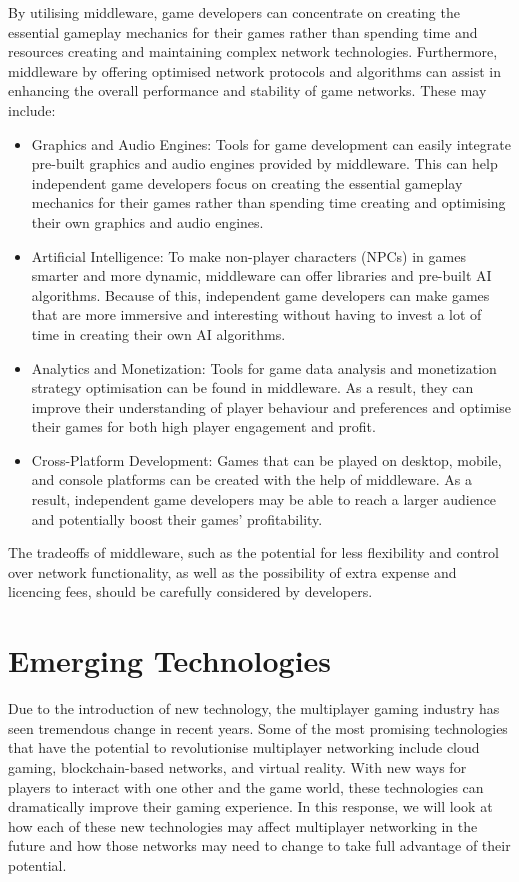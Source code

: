 By utilising middleware, game developers can concentrate on creating the essential gameplay mechanics for their games rather than spending time and resources creating and maintaining complex network technologies. Furthermore, middleware by offering optimised network protocols and algorithms can assist in enhancing the overall performance and stability of game networks. These may include:
\begin{itemize}
    \item Graphics and Audio Engines: Tools for game development can easily integrate pre-built graphics and audio engines provided by middleware. This can help independent game developers focus on creating the essential gameplay mechanics for their games rather than spending time creating and optimising their own graphics and audio engines.\cite{gamemiddleware}
    \item Artificial Intelligence: To make non-player characters (NPCs) in games smarter and more dynamic, middleware can offer libraries and pre-built AI algorithms. Because of this, independent game developers can make games that are more immersive and interesting without having to invest a lot of time in creating their own AI algorithms.\cite{gamenetworkmiddleware}
    \item Analytics and Monetization: Tools for game data analysis and monetization strategy optimisation can be found in middleware. As a result, they can improve their understanding of player behaviour and preferences and optimise their games for both high player engagement and profit.\cite{gamenetworkmiddleware}
    \item Cross-Platform Development: Games that can be played on desktop, mobile, and console platforms can be created with the help of middleware. As a result, independent game developers may be able to reach a larger audience and potentially boost their games' profitability.\cite{gamemiddleware}
\end{itemize}
The tradeoffs of middleware, such as the potential for less flexibility and control over network functionality, as well as the possibility of extra expense and licencing fees, should be carefully considered by developers.

\section{Emerging Technologies}
Due to the introduction of new technology, the multiplayer gaming industry has seen tremendous change in recent years. Some of the most promising technologies that have the potential to revolutionise multiplayer networking include cloud gaming, blockchain-based networks, and virtual reality. With new ways for players to interact with one other and the game world, these technologies can dramatically improve their gaming experience. In this response, we will look at how each of these new technologies may affect multiplayer networking in the future and how those networks may need to change to take full advantage of their potential.\cite{gartneremerging}

